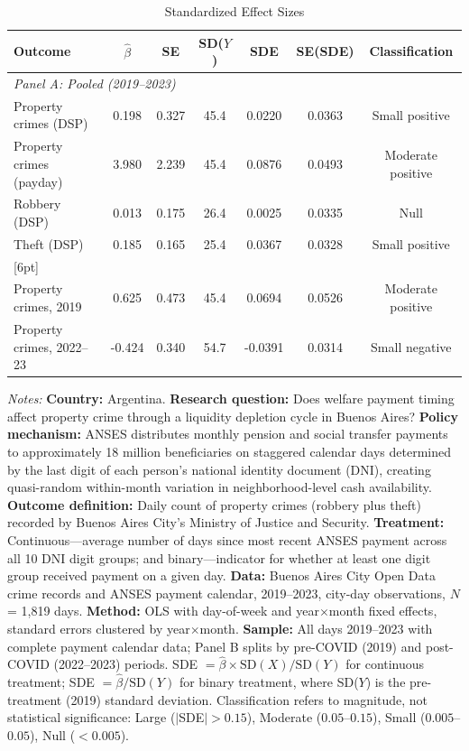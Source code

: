\begin{table}[t]
\centering
\caption{Standardized Effect Sizes}
\label{tab:sde}
\footnotesize
\begin{tabular}{lcccccc}
\hline\hline
Outcome & $\hat{\beta}$ & SE & SD($Y$) & SDE & SE(SDE) & Classification \\
\hline
\multicolumn{7}{l}{\textit{Panel A: Pooled (2019--2023)}} \\[3pt]
Property crimes (DSP) & 0.198 & 0.327 & 45.4 & 0.0220 & 0.0363 & Small positive \\
Property crimes (payday) & 3.980 & 2.239 & 45.4 & 0.0876 & 0.0493 & Moderate positive \\
Robbery (DSP) & 0.013 & 0.175 & 26.4 & 0.0025 & 0.0335 & Null \\
Theft (DSP) & 0.185 & 0.165 & 25.4 & 0.0367 & 0.0328 & Small positive \\
{}[6pt]
\multicolumn{7}{l}{\textit{Panel B: Heterogeneous (period splits)}} \\[3pt]
Property crimes, 2019 & 0.625 & 0.473 & 45.4 & 0.0694 & 0.0526 & Moderate positive \\
Property crimes, 2022--23 & -0.424 & 0.340 & 54.7 & -0.0391 & 0.0314 & Small negative \\
\hline
\end{tabular}
\par\vspace{0.5em}
{\scriptsize \textit{Notes:} \textbf{Country:} Argentina. \textbf{Research question:} Does welfare payment timing affect property crime through a liquidity depletion cycle in Buenos Aires? \textbf{Policy mechanism:} ANSES distributes monthly pension and social transfer payments to approximately 18 million beneficiaries on staggered calendar days determined by the last digit of each person's national identity document (DNI), creating quasi-random within-month variation in neighborhood-level cash availability. \textbf{Outcome definition:} Daily count of property crimes (robbery plus theft) recorded by Buenos Aires City's Ministry of Justice and Security. \textbf{Treatment:} Continuous---average number of days since most recent ANSES payment across all 10 DNI digit groups; and binary---indicator for whether at least one digit group received payment on a given day. \textbf{Data:} Buenos Aires City Open Data crime records and ANSES payment calendar, 2019--2023, city-day observations, $N$ = 1,819 days. \textbf{Method:} OLS with day-of-week and year$\times$month fixed effects, standard errors clustered by year$\times$month. \textbf{Sample:} All days 2019--2023 with complete payment calendar data; Panel B splits by pre-COVID (2019) and post-COVID (2022--2023) periods. SDE $= \hat{\beta} \times \text{SD}(X) / \text{SD}(Y)$ for continuous treatment; SDE $= \hat{\beta} / \text{SD}(Y)$ for binary treatment, where SD($Y$) is the pre-treatment (2019) standard deviation. Classification refers to magnitude, not statistical significance: Large ($|$SDE$| > 0.15$), Moderate ($0.05$--$0.15$), Small ($0.005$--$0.05$), Null ($< 0.005$).}
\end{table}
